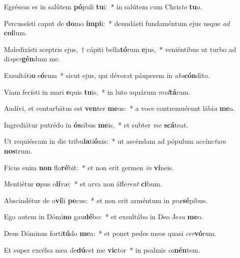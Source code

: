 \item Egréssus es in salútem \textbf{pó}puli \textbf{tu}i:~* in salútem cum Chris\textit{to} \textbf{tu}o.
\item Percussísti caput de \textbf{do}mo \textbf{ím}\textbf{pi}i:~* denudásti fundaméntum ejus usque \textit{ad} \textbf{col}lum.
\item Maledixísti sceptris ejus,~† cápiti bella\textbf{tó}rum \textbf{e}jus,~* veniéntibus ut turbo ad di\textit{sper}\textbf{gén}dum me.
\item Exsultáti\textbf{o} e\textbf{ó}rum~* sicut ejus, qui dévorat páuperem in \textit{abs}\textbf{cón}dito.
\item Viam fecísti in mari \textbf{e}quis \textbf{tu}is,~* in luto aquárum \textit{mul}\textbf{tá}rum.
\item Audívi, et conturbátus est \textbf{ven}ter \textbf{me}us:~* a voce contremuérunt lábi\textit{a} \textbf{me}a.
\item Ingrediátur putrédo in \textbf{ós}sibus \textbf{me}is,~* et subter \textit{me} \textbf{scá}teat.
\item Ut requiéscam in die tribu\textbf{la}ti\textbf{ó}nis:~* ut ascéndam ad pópulum accínc\textit{tum} \textbf{nos}trum.
\item Ficus enim \textbf{non} flo\textbf{ré}bit:~* et non erit germen \textit{in} \textbf{ví}neis.
\item Mentiétur \textbf{o}pus o\textbf{lí}væ:~* et arva non áffe\textit{rent} \textbf{ci}bum.
\item Abscindétur de o\textbf{ví}li \textbf{pe}cus:~* et non erit arméntum in \textit{præ}\textbf{sé}pibus.
\item Ego autem in Dómi\textbf{no} gau\textbf{dé}bo:~* et exsultábo in Deo Je\textit{su} \textbf{me}o.
\item Deus Dóminus forti\textbf{tú}do \textbf{me}a:~* et ponet pedes meos quasi \textit{cer}\textbf{vó}rum.
\item Et super excélsa mea de\textbf{dú}cet me \textbf{vic}tor~* in psalmis \textit{ca}\textbf{nén}tem.
